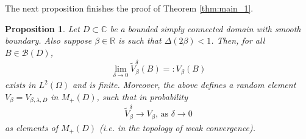 \documentclass[a4paper, 11pt, reqno]{amsart}
\theoremstyle{definition} \newtheorem{defn}{Definition}[section]
\theoremstyle{remark} \newtheorem{rem}[defn]{Remark}
\theoremstyle{remark} \newtheorem*{rem*}{Remark}
\theoremstyle{plain} \newtheorem{thm}[defn]{Theorem}
\theoremstyle{plain} \newtheorem{lem}[defn]{Lemma}
\theoremstyle{plain} \newtheorem{prop}[defn]{Proposition}
\theoremstyle{plain} \newtheorem{cor}[defn]{Corollary}
\theoremstyle{remark} \newtheorem{exm}[defn]{\textbf{Example}}
\theoremstyle{remark} \newtheorem{exms}[defn]{\textbf{Examples}}
\theoremstyle{remark} \newtheorem*{bl}{}
\numberwithin{equation}{section} %
\newcommand{\mc}{\mathcal}
\newcommand{\C}{\mathbb{C}}
\newcommand{\R}{\mathbb{R}}
\begin{document}
    The next proposition finishes the proof of Theorem \ref{thm:main_1}.     
    
	\begin{prop}\label{prop:layering_field_conv}
		Let $D \subset \C$ be a bounded simply connected domain with smooth boundary. Also suppose $\beta \in \R$ is such that $\Delta(2\beta) < 1$. Then, for all $B \in \mc{B}(D)$,
		\begin{align}\label{eq:layering_field_conv_0}
			\lim_{\delta \to 0}\tilde{V}^{\delta}_{\beta}(B) =: V_{\beta}(B) 
		\end{align}
		exists in $L^2(\Omega)$ and is finite. Moreover, the above defines a random element $V_{\beta} = V_{\beta, \lambda, D}$ in $M_+(D)$, such that in probability 
		\begin{align}\label{eq:layering_field_conv_1}
			\tilde{V}^{\delta}_{\beta} \to V_{\beta} \text{, as } \delta \to 0
		\end{align}
		as elements of $M_+(D)$ (i.e. in the topology of weak convergence).
	\end{prop}
	
\end{document}

